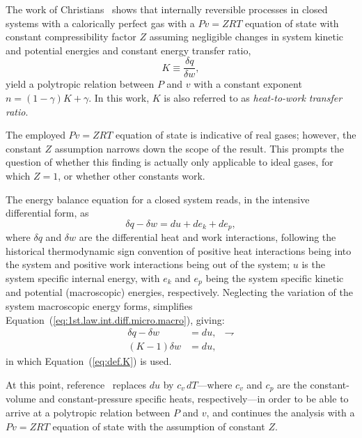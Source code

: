 \documentclass[fleqn,11pt]{SelfArx}
\begin{document}
    The  work  of  Christians~\cite{2012-ChristiansJ-IntJMechEngEduc}  shows   that   internally
    reversible processes in closed systems with a calorically perfect gas  with  a  $Pv  =  ZRT$
    equation of state with constant compressibility factor $Z$ assuming  negligible  changes  in
    system kinetic and potential energies and constant energy transfer ratio,
    \begin{equation}
        K \equiv \frac{\delta q}{\delta w},
        \label{eq:def.K}
    \end{equation}
    \noindent yield a polytropic relation between $P$ and $v$ with a constant exponent $n = (1 -
    \gamma)K + \gamma$. In this work, $K$ is also referred  to  as  \emph{heat-to-work  transfer
    ratio}.

    The employed $Pv = ZRT$ equation of state is indicative of real gases; however, the constant
    $Z$ assumption narrows down the scope of the result. This prompts the  question  of  whether
    this finding is actually only applicable to ideal gases, for which $Z=1$, or  whether  other
    constants work.

    The energy balance equation for a closed system reads, in the intensive  differential  form,
    as
    \begin{equation}
        \delta q - \delta w = du + de_k + de_p,
        \label{eq:1st.law.int.diff.micro.macro}
    \end{equation}
    \noindent where $\delta q$ and $\delta w$ are the differential heat and  work  interactions,
    following the historical thermodynamic sign convention of positive heat  interactions  being
    into the system and positive work interactions being out of the system; $u$  is  the  system
    specific internal energy, with $e_k$  and  $e_p$  being  the  system  specific  kinetic  and
    potential (macroscopic) energies, respectively.  Neglecting  the  variation  of  the  system
    macroscopic  energy  forms,   simplifies   Equation~(\ref{eq:1st.law.int.diff.micro.macro}),
    giving:
    \begin{align}
        \delta q - \delta w & = du, & \rightharpoondown
        \label{eq:1st.law.int.diff} \\
        (K-1)\delta w & = du,
        \label{eq:1st.law.int.diff.K}
    \end{align}
    \noindent in which Equation~(\ref{eq:def.K}) is used.

    At  this   point,   reference~\cite{2012-ChristiansJ-IntJMechEngEduc}   replaces   $du$   by
    $c_v\,dT$---where $c_v$ and $c_p$ are the  constant-volume  and  constant-pressure  specific
    heats, respectively---in order to be able to arrive at a polytropic relation between $P$ and
    $v$, and continues the analysis with a $Pv = ZRT$ equation of state with the  assumption  of
    constant $Z$.
\end{document}
